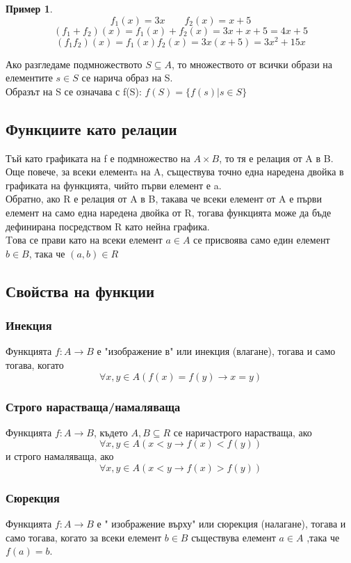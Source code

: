 \documentclass[fleqn, 12pt]{article}
\theoremstyle{definition}
\newtheorem{example}{Пример}[subsection]
\begin{document}
\begin{example}
$$f_1(x) = 3x \qquad f_2(x) = x+5 $$
$$(f_1+ f_2)(x) =  f_1(x) + f_2(x) = 3x + x + 5 = 4x + 5$$
$$(f_1f_2)(x) =  f_1(x) f_2(x) = 3x(x + 5) = 3x^2 + 15x$$
\end{example}
Ако разгледаме подмножеството $S \subseteq A$, то множеството от всички образи на елементите $s \in S$ се нарича образ на S.\\  
Образът на S се означава с f(S): $f(S) = \{f(s) | s \in S\}$

\subsection{Функциите като релации}
Тъй като графиката на f е подмножество на $A \times B$, то тя е релация от A в B.\\
Още повече, за всеки елементa на A, съществува точно една наредена двойка в графиката на функцията, чийто първи елемент е a.\\
Обратно, ако R е релация от A в B, такава че всеки елемент от A е първи елемент на само една наредена двойка от R, тогава функцията може да бъде дефинирана посредством R като нейна графика.\\
Tова се прави като на всеки елемент $a \in A$ се присвоява само един елемент $b \in B$, така че $(a, b) \in R$

\subsection{Свойства на функции}

\subsubsection{Инекция}
Функцията $f: A \to B$ е "изображение в" или инекция (влагане), тогава и само тогава, когато
$$\forall x, y \in A (f(x) = f(y) \to x = y)$$

\subsubsection{Строго нарастваща/намаляваща}
Функцията $f: A \to B$, където $A,B \subseteq R$ се наричастрого нарастваща, ако
$$\forall x,y\in A (x < y \to f(x) < f(y))$$ 
и строго намаляваща, ако
$$\forall x,y\in A (x < y \to f(x) > f(y))$$ 

\subsubsection{Сюрекция}
Функцията $f: A \to B$ е " изображение върху" или сюрекция (налагане), тогава и само тогава, когато за всеки елемент $b \in B$ съществува елемент $a \in A$ ,така че $f(a) = b$.
\end{document}
